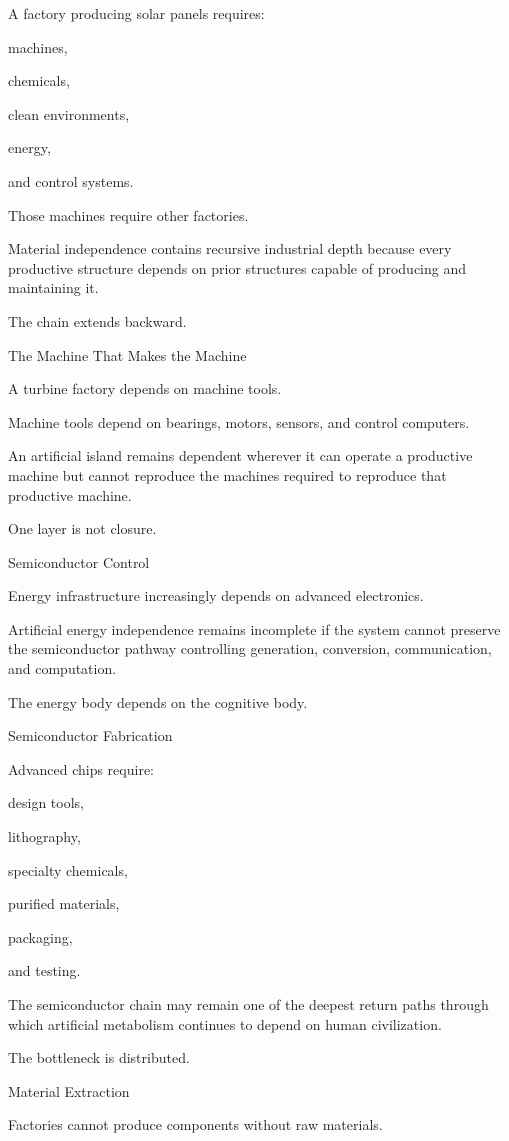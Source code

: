 A factory producing solar panels requires:

machines,

chemicals,

clean environments,

energy,

and control systems.

Those machines require other factories.

Material independence contains recursive industrial depth because every productive structure depends on prior structures capable of producing and maintaining it.

The chain extends backward.

The Machine That Makes the Machine

A turbine factory depends on machine tools.

Machine tools depend on bearings, motors, sensors, and control computers.

An artificial island remains dependent wherever it can operate a productive machine but cannot reproduce the machines required to reproduce that productive machine.

One layer is not closure.

Semiconductor Control

Energy infrastructure increasingly depends on advanced electronics.

Artificial energy independence remains incomplete if the system cannot preserve the semiconductor pathway controlling generation, conversion, communication, and computation.

The energy body depends on the cognitive body.

Semiconductor Fabrication

Advanced chips require:

design tools,

lithography,

specialty chemicals,

purified materials,

packaging,

and testing.

The semiconductor chain may remain one of the deepest return paths through which artificial metabolism continues to depend on human civilization.

The bottleneck is distributed.

Material Extraction

Factories cannot produce components without raw materials.

